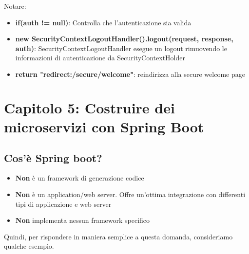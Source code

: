 \documentclass[11pt,a4paper]{book}
\begin{document}
Notare:
\begin{itemize}
	\item \textbf{if(auth != null)}: Controlla che l'autenticazione sia valida
	\item \textbf{new SecurityContextLogoutHandler().logout(request, response, auth)}: SecurityContextLogoutHandler esegue un logout rimuovendo le informazioni di autenticazione da SecurityContextHolder
	\item \textbf{return "redirect:/secure/welcome"}: reindirizza alla secure welcome page
\end{itemize}

\section{Capitolo 5: Costruire dei microservizi con Spring Boot}
\subsection{Cos'è Spring boot?}
\begin{itemize}
	\item \textbf{Non} è un framework di generazione codice
	\item \textbf{Non} è un application/web server. Offre un'ottima integrazione con differenti tipi di applicazione e web server
	\item \textbf{Non} implementa nessun framework specifico
\end{itemize}

Quindi, per rispondere in maniera semplice a questa domanda, consideriamo qualche esempio.
\end{document}
